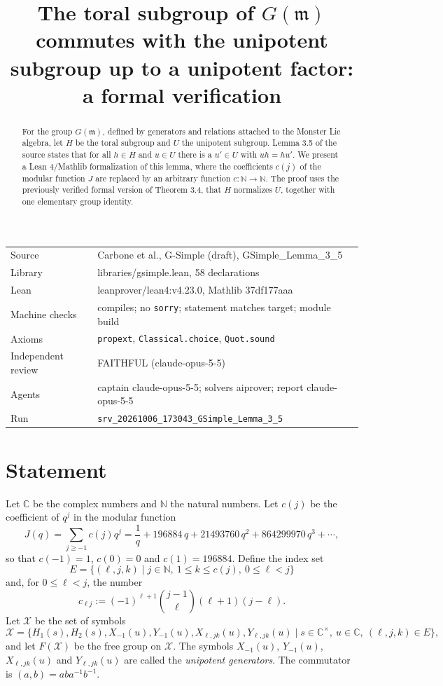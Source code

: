 \documentclass[11pt]{article}
\title{The toral subgroup of $G(\mathfrak{m})$ commutes with the unipotent subgroup up to a unipotent factor: a formal verification}
\date{}
\theoremstyle{definition}
\theoremstyle{remark}
\newcommand{\C}{\mathbb{C}}
\newcommand{\N}{\mathbb{N}}
\newcommand{\cX}{\mathcal{X}}
\begin{document}
\maketitle
\begin{abstract}
For the group $G(\mathfrak{m})$, defined by generators and relations attached to the Monster Lie algebra, let $H$ be the toral subgroup and $U$ the unipotent subgroup. Lemma 3.5 of the source states that for all $h\in H$ and $u\in U$ there is a $u'\in U$ with $uh=hu'$. We present a Lean 4/Mathlib formalization of this lemma, where the coefficients $c(j)$ of the modular function $J$ are replaced by an arbitrary function $c:\mathbb{N}\to\mathbb{N}$. The proof uses the previously verified formal version of Theorem 3.4, that $H$ normalizes $U$, together with one elementary group identity.
\end{abstract}

\begin{center}\small
\begin{tabular}{@{}ll@{}}
\toprule
Source & Carbone et al., G-Simple (draft), GSimple\_Lemma\_3\_5 \\
Library & libraries/gsimple.lean, 58 declarations \\
Lean & leanprover/lean4:v4.23.0, Mathlib 37df177aaa \\
Machine checks & compiles; no \texttt{sorry}; statement matches target; module build \\
Axioms & \texttt{propext}, \texttt{Classical.choice}, \texttt{Quot.sound} \\
Independent review & FAITHFUL (claude-opus-5-5) \\
Agents & captain claude-opus-5-5; solvers aiprover; report claude-opus-5-5 \\
Run & \texttt{srv\_20261006\_173043\_GSimple\_Lemma\_3\_5} \\
\bottomrule
\end{tabular}
\end{center}

\tableofcontents

\section{Statement}

Let $\C$ be the complex numbers and $\N$ the natural numbers. Let $c(j)$ be the coefficient of $q^j$ in the modular function
\[
J(q)=\sum_{j\geq -1}c(j)q^j=\frac1q+196884\,q+21493760\,q^2+864299970\,q^3+\cdots,
\]
so that $c(-1)=1$, $c(0)=0$ and $c(1)=196884$. Define the index set
\[
E=\{(\ell,j,k)\mid j\in\N,\ 1\le k\le c(j),\ 0\le \ell<j\}
\]
and, for $0\le\ell<j$, the number
\[
c_{\ell j}:=(-1)^{\ell+1}\binom{j-1}{\ell}(\ell+1)(j-\ell).
\]
Let $\cX$ be the set of symbols
\[
\cX=\{H_1(s),H_2(s),X_{-1}(u),Y_{-1}(u),X_{\ell,jk}(u),Y_{\ell,jk}(u)\mid s\in\C^\times,\ u\in\C,\ (\ell,j,k)\in E\},
\]
and let $F(\cX)$ be the free group on $\cX$. The symbols $X_{-1}(u)$, $Y_{-1}(u)$, $X_{\ell,jk}(u)$ and $Y_{\ell,jk}(u)$ are called the \emph{unipotent generators}. The commutator is $(a,b)=aba^{-1}b^{-1}$.
\end{document}
